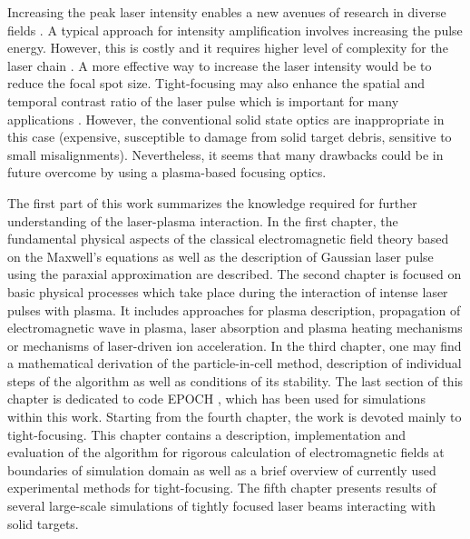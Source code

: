 Increasing the peak laser intensity enables a new avenues of research in diverse fields \cite{Zewail2010, Bulanov2004, Malka2004}. A typical approach for intensity amplification involves increasing the pulse energy. However, this is costly and it requires higher level of complexity for the laser chain \cite{Fuchs2014}. A more effective way to increase the laser intensity would be to reduce the focal spot size. Tight-focusing may also enhance the spatial and temporal contrast ratio of the laser pulse which is important for many applications \cite{Fuchs2014}. However, the conventional solid state optics are inappropriate in this case (expensive, susceptible to damage from solid target debris, sensitive to small misalignments). Nevertheless, it seems that many drawbacks could be in future overcome by using a plasma-based focusing optics.

The first part of this work summarizes the knowledge required for further understanding of the laser-plasma interaction. In the first chapter, the fundamental physical aspects of the classical electromagnetic field theory \cite{Stratton2007, Jackson2005, Feynman1963, Thide2011} based on the Maxwell's equations as well as the description of Gaussian laser pulse using the paraxial approximation \cite{Born2013} are described. The second chapter is focused on basic physical processes which take place during the interaction of intense laser pulses with plasma. It includes approaches for plasma description, propagation of electromagnetic wave in plasma, laser absorption and plasma heating mechanisms or mechanisms of laser-driven ion acceleration. In the third chapter, one may find a mathematical derivation of the particle-in-cell method, description of individual steps of the algorithm as well as conditions of its stability. The last section of this chapter is dedicated to code EPOCH \cite{bennett}, which has been used for simulations within this work. Starting from the fourth chapter, the work is devoted mainly to tight-focusing. This chapter contains a description, implementation and evaluation of the algorithm for rigorous calculation of electromagnetic fields at boundaries of simulation domain \cite{Thiele2016} as well as a brief overview of currently used experimental methods for tight-focusing. The fifth chapter presents results of several large-scale simulations of tightly focused laser beams interacting with solid targets.

